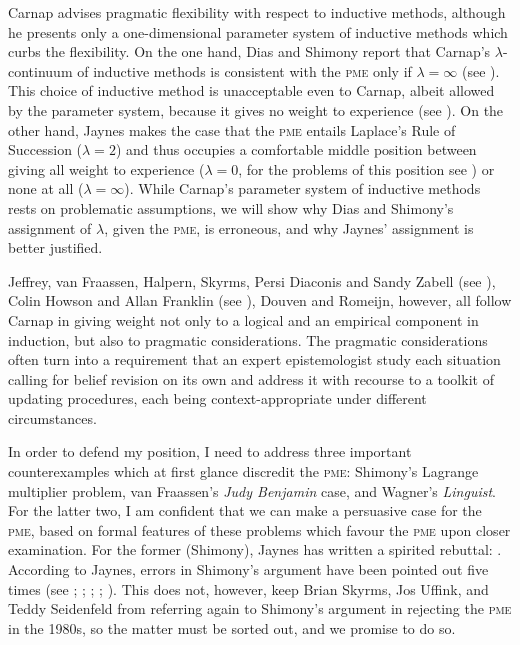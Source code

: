 \documentclass[11pt]{article}
\begin{document}
Carnap advises pragmatic flexibility with respect to inductive
methods, although he presents only a one-dimensional parameter system
of inductive methods which curbs the flexibility. On the one hand,
Dias and Shimony report that Carnap's $\lambda$-continuum of inductive
methods is consistent with the \textsc{pme} only if $\lambda=\infty$
(see ). This choice of inductive method is
unacceptable even to Carnap, albeit allowed by the parameter system,
because it gives no weight to experience (see
). On the other hand, Jaynes makes the case
that the \textsc{pme} entails Laplace's Rule of Succession
($\lambda=2$) and thus occupies a comfortable middle position between
giving all weight to experience ($\lambda=0$, for the problems of this
position see ) or none at all
($\lambda=\infty$). While Carnap's parameter system of inductive
methods rests on problematic assumptions, we will show why Dias and
Shimony's assignment of $\lambda$, given the \textsc{pme}, is
erroneous, and why Jaynes' assignment is better justified.

Jeffrey, van Fraassen, Halpern, Skyrms, Persi Diaconis and Sandy
Zabell (see ), Colin Howson and Allan
Franklin (see ), Douven and Romeijn,
however, all follow Carnap in giving weight not only to a logical and
an empirical component in induction, but also to pragmatic
considerations. The pragmatic considerations often turn into a
requirement that an expert epistemologist study each situation calling
for belief revision on its own and address it with recourse to a
toolkit of updating procedures, each being context-appropriate under
different circumstances.

In order to defend my position, I need to address three important
counterexamples which at first glance discredit the \textsc{pme}:
Shimony's Lagrange multiplier problem, van Fraassen's \emph{Judy
  Benjamin} case, and Wagner's \emph{Linguist}. For the latter two, I
am confident that we can make a persuasive case for the \textsc{pme},
based on formal features of these problems which favour the
\textsc{pme} upon closer examination. For the former (Shimony), Jaynes
has written a spirited rebuttal:  . According to
Jaynes, errors in Shimony's argument have been pointed out five times
(see ; ;
; ;
). This does not, however, keep Brian Skyrms,
Jos Uffink, and Teddy Seidenfeld from referring again to Shimony's
argument in rejecting the \textsc{pme} in the 1980s, so the matter
must be sorted out, and we promise to do so.
\end{document}
